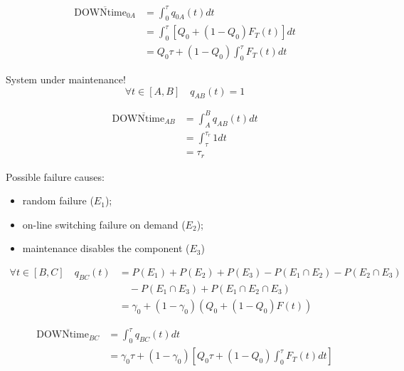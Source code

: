 \begin{equation*}
    \begin{split}
        \overline{\text{DOWNtime}_{0A}} &= \int_0^\tau q_{0A}(t)dt \\
        &= \int_0^\tau [Q_0+(1-Q_0)F_T(t)]dt \\
        &= Q_0\tau + (1-Q_0)\int_0^\tau F_T(t)dt
    \end{split}
\end{equation*}

 \par
System under maintenance!
\begin{equation*}
    \forall t \in [A,B] \quad q_{AB}(t) = 1
\end{equation*}

\begin{equation*}
    \begin{split}
        \overline{\text{DOWNtime}_{AB}} &= \int_A^B q_{AB}(t)dt \\
        &= \int_\tau^{\tau_r} 1dt \\
        &= \tau_r
    \end{split}
\end{equation*}

 \par
Possible failure causes:
\begin{itemize}
    \item random failure ($E_1$);
    \item on-line switching failure on demand ($E_2$);
    \item maintenance disables the component ($E_3$)
\end{itemize}

\begin{equation*}
    \begin{split}
        \forall t \in [B,C] \quad q_{BC}(t) &= P(E_1)+P(E_2) +P(E_3) - P(E_1\cap E_2) - P(E_2\cap E_3) \\
        &\quad - P(E_1\cap E_3) + P(E_1\cap E_2\cap E_3) \\
        &= \gamma_0 + (1-\gamma_0)(Q_0 + (1-Q_0)F(t))
    \end{split}
\end{equation*}

\begin{equation*}
    \begin{split}
        \overline{\text{DOWNtime}_{BC}} &= \int_0^\tau q_{BC}(t)dt \\
        &= \gamma_0\tau + (1-\gamma_0)\left[Q_0\tau + (1-Q_0)\int_0^\tau F_T(t)dt\right]
    \end{split}
\end{equation*}

